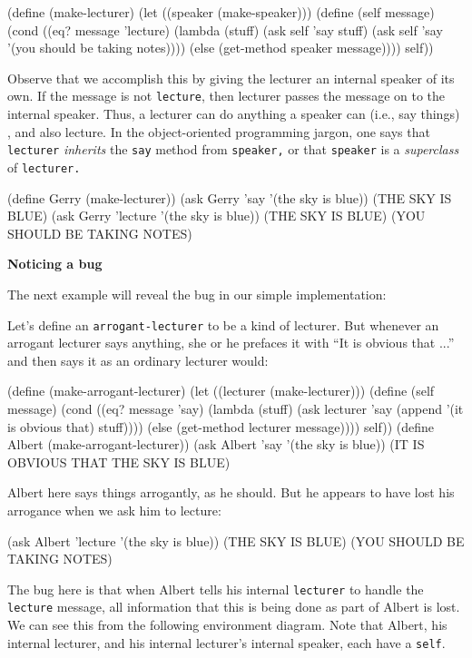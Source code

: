 \beginlisp
(define (make-lecturer)
  (let ((speaker (make-speaker)))
    (define (self message)
      (cond ((eq? message 'lecture)
             (lambda (stuff)
               (ask self 'say stuff)
               (ask self 'say '(you should be taking notes))))
            (else (get-method speaker message))))
    self))
\endlisp

Observe that we accomplish this by giving the lecturer an internal
speaker of its own. If the message is not {\tt lecture}, then lecturer
passes the message on
to the internal speaker.  Thus, a lecturer can do anything a speaker can
(i.e., say things) , and also lecture.  In the object-oriented
programming jargon, one says that {\tt  lecturer}  {\it inherits} the
{\tt say}  method from {\tt speaker,} or that {\tt speaker} is a {\it 
superclass}  of {\tt  lecturer.}

\beginlisp
(define Gerry (make-lecturer))
(ask Gerry 'say '(the sky is blue))
(THE SKY IS BLUE)
\null
(ask Gerry 'lecture '(the sky is blue))
(THE SKY IS BLUE)
(YOU SHOULD BE TAKING NOTES)
\endlisp


{\bf Noticing a bug}

The next example will reveal the bug in our simple implementation:

Let's define an {\tt arrogant-lecturer} to be a kind of lecturer.  But
whenever an arrogant lecturer says anything, she or he prefaces it
with ``It is obvious that ...''  and then says it as an ordinary
lecturer would:

\beginlisp
(define (make-arrogant-lecturer)
  (let ((lecturer (make-lecturer)))
    (define (self message)
      (cond ((eq? message 'say)
             (lambda (stuff)
               (ask lecturer 'say (append '(it is obvious that) stuff))))
            (else (get-method lecturer message))))
    self))
\null
(define Albert (make-arrogant-lecturer))
\null
(ask Albert 'say '(the sky is blue))
(IT IS OBVIOUS THAT THE SKY IS BLUE)
\endlisp

Albert here says things arrogantly, as he should.  But he appears to have
lost his arrogance when we ask him to lecture: 

\beginlisp
(ask Albert 'lecture '(the sky is blue))
(THE SKY IS BLUE)
(YOU SHOULD BE TAKING NOTES)
\endlisp

The bug here is that when Albert tells his internal {\tt lecturer} to handle the
{\tt lecture}  message, all information that this is being done as part of Albert
is lost.  We can see this from the following environment diagram.  Note
that Albert, his internal lecturer, and his internal lecturer's internal
speaker, each have a {\tt self}.     

